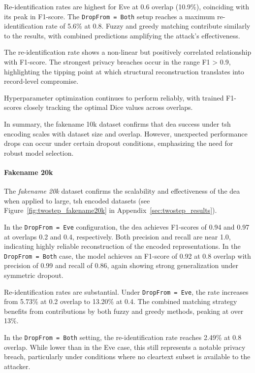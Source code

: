 Re-identification rates are highest for Eve at 0.6 overlap (10.9\%), coinciding with its peak in F1-score.
The \texttt{DropFrom = Both} setup reaches a maximum re-identification rate of 5.6\% at 0.8.
Fuzzy and greedy matching contribute similarly to the results, with combined predictions amplifying the attack's effectiveness.

The re-identification rate shows a non-linear but positively correlated relationship with F1-score.
The strongest privacy breaches occur in the range F1 > 0.9, highlighting the tipping point at which structural reconstruction translates into record-level compromise.

Hyperparameter optimization continues to perform reliably, with trained F1-scores closely tracking the optimal Dice values across overlaps.

In summary, the fakename 10k dataset confirms that \ac{dea} success under \ac{tsh} encoding scales with dataset size and overlap.
However, unexpected performance drops can occur under certain dropout conditions, emphasizing the need for robust model selection.


\paragraph{Fakename 20k}

The \textit{fakename 20k} dataset confirms the scalability and effectiveness of the \ac{dea} when applied to large, \ac{tsh} encoded datasets (see Figure~\ref{fig:twostep_fakename20k} in Appendix~\ref{sec:twostep_results}).

In the \texttt{DropFrom = Eve} configuration, the \ac{dea} achieves F1-scores of 0.94 and 0.97 at overlaps 0.2 and 0.4, respectively.
Both precision and recall are near 1.0, indicating highly reliable reconstruction of the encoded representations.
In the \texttt{DropFrom = Both} case, the model achieves an F1-score of 0.92 at 0.8 overlap with precision of 0.99 and recall of 0.86, again showing strong generalization under symmetric dropout.

Re-identification rates are substantial.
Under \texttt{DropFrom = Eve}, the rate increases from 5.73\% at 0.2 overlap to 13.20\% at 0.4.
The combined matching strategy benefits from contributions by both fuzzy and greedy methods, peaking at over 13\%.

In the \texttt{DropFrom = Both} setting, the re-identification rate reaches 2.49\% at 0.8 overlap.
While lower than in the Eve case, this still represents a notable privacy breach, particularly under conditions where no cleartext subset is available to the attacker.

